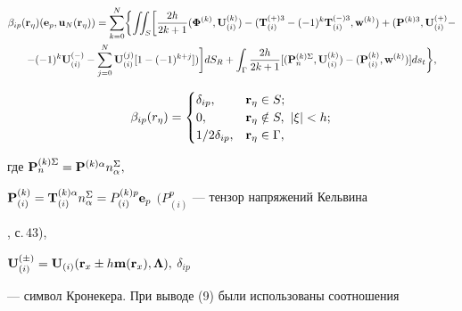 \begin{gather} 


\beta_{ip}({\bold r}_\eta)({\bold e}_p,{\bold u}_N({\bold r}_\eta))= 


\sum^N_{k=0}\biggl\{\iint_S\biggl[\frac{2h}{2k+1} 


({\boldsymbol \Phi}^{(k)},{\bold U}^{(k)}_{(i)})- 


({\bold T}^{(+)3}_{(i)}-(-1)^k{\bold T}^{(-)3}_{(i)},{\bold w}^{(k)})+ 


({\bold P}^{(k)3},{\bold U}^{(+)}_{(i)}- 


\notag \\ 


-(-1)^k{\bold U}^{(-)}_{(i)} 


-\sum^N_{j=0}{\bold U}^{(j)}_{(i)}[1-(-1)^{k+j}])\biggr]dS_R+


\int_\Gamma\frac{2h}{2k+1}[({\bold P}^{(k)\Sigma}_n, 


{\bold U}^{(k)}_{(i)})-({\bold P}^{(k)}_{(i)},{\bold w}^{(k)})] 


ds_t\biggr\}, 


\end{gather} 


$$ 


\beta_{ip}(r_\eta)= 


\begin{cases} 


\delta_{ip},   & {\bold r}_\eta\in S; \\


          0,   & {\bold r}_\eta\notin S,\text{\ }  |\xi|<h; \\


1/2\delta_{ip},& {\bold r}_\eta\in \Gamma, 


\end{cases} 


$$ 


где ${\bold P}^{(k)\Sigma}_n={\bold P}^{(k)\alpha}n^\Sigma_\alpha,$ 


${\bold P}^{(k)}_{(i)}={\bold T}^{(k)\alpha}_{(i)}n^\Sigma_\alpha 


=P^{(k)p}_{(i)}{\bold e}_p$ $(P^p_{(i)}$ --- тензор напряжений Кельвина 


\cite{Ugo}, с.\,43),  


${\bold U}^{(\pm)}_{(i)}={\bold U}_{(i)}({\bold r}_x \pm h{\bold m} 


({\bold r}_x),{\boldsymbol \Lambda}),$ $\delta_{ip}$ 


--- символ Кронекера. При выводе (9) были использованы соотношения 


